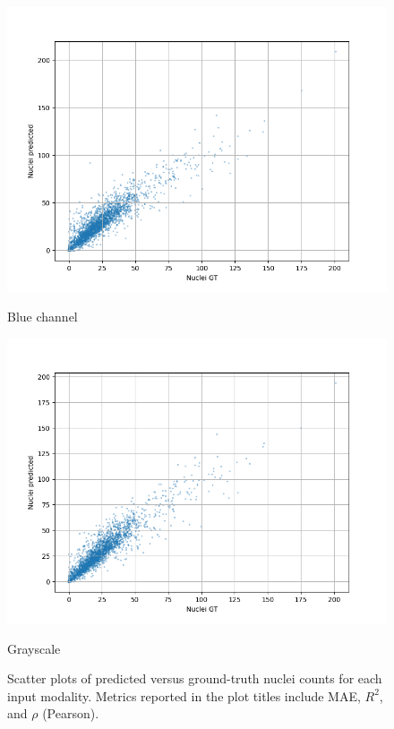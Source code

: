 \documentclass[target=bach,aauheader=,style=]{thud}
\begin{document}
\begin{figure}[ht]
\begin{minipage}{0.45\textwidth}
    \centering
    \includegraphics[width=\linewidth]{imgs/diffusion_graph_blu.png}
    \caption*{Blue channel}
\end{minipage}
\hspace{0.5cm}
\begin{minipage}{0.45\textwidth}
    \centering
    \includegraphics[width=\linewidth]{imgs/Diffusion_graph_gray.png}
    \caption*{Grayscale}
\end{minipage}

\caption{Scatter plots of predicted versus ground-truth nuclei counts for each input modality. Metrics reported in the plot titles include MAE, $R^2$, and $\rho$ (Pearson).}
\label{fig:scatter_counts}
\end{figure}
\end{document}
